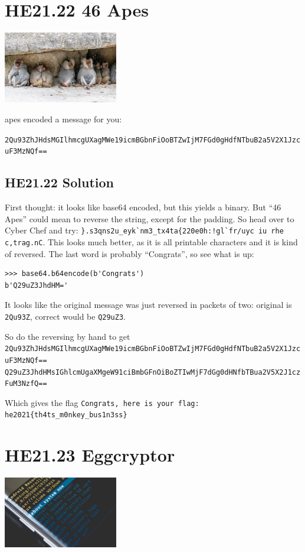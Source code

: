 \documentclass[english,a4paper,nols,noindent]{tufte-handout}
\begin{document}
\hypertarget{he21.22}{%
  \section{HE21.22 46 Apes}
  \label{he21.22}}
\begin{marginfigure}
    \includegraphics[width=50mm]{images/challenge22.jpg}
\end{marginfigure}

 apes encoded a message for you:

\verb+2Qu93ZhJHdsMGIlhmcgUXagMWe19icmBGbnFiOoBTZwIjM7FGd0gHdfNTbuB2a5V2X1JzcuF3MzNQf==+

\hypertarget{he21.22-solution}{%
\subsection{HE21.22 Solution}\label{he21.22-solution}}

\noindent First thought: it looks like base64 encoded, but this yields a binary.  But ``46 Apes'' could mean to reverse the string, except for the padding.  So head over to Cyber Chef and try: \verb+}.s3qns2u_eyk`nm3_tx4ta{220e0h:!gl`fr/uyc iu rhe c,trag.nC+. This looks much better, as it is all printable characters and it is kind of reversed.  The last word is probably ``Congrats'', so see what is up:

\begin{verbatim}
>>> base64.b64encode(b'Congrats')
b'Q29uZ3JhdHM='
\end{verbatim}

It looks like the original message was just reversed in packets of two:
original is \verb+2Qu93Z+, correct would be \verb+Q29uZ3+.

So do the reversing by hand to get
\verb+2Qu93ZhJHdsMGIlhmcgUXagMWe19icmBGbnFiOoBTZwIjM7FGd0gHdfNTbuB2a5V2X1JzcuF3MzNQf==+
\verb+Q29uZ3JhdHMsIGhlcmUgaXMgeW91ciBmbGFnOiBoZTIwMjF7dGg0dHNfbTBua2V5X2J1czFuM3NzfQ==+

Which gives the flag \verb+Congrats, here is your flag: he2021{th4ts_m0nkey_bus1n3ss}+

\hypertarget{he21.23}{%
  \section{HE21.23 Eggcryptor}
  \label{he21.23}}
\begin{marginfigure}
    \includegraphics[width=50mm]{images/challenge23.jpg}
\end{marginfigure}
\end{document}
